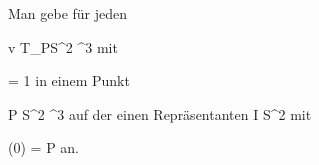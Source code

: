 {

Man gebe für jeden

\mavergleichskette
{\vergleichskette
{ v
}
{ \in }{ T_PS^2
}
{ \subseteq }{ \R^3
}
{    }{
}
{   }{
}
}
{}{}{}
mit

\mavergleichskette
{\vergleichskette
{  \Vert
}
{ = }{ 1
}
{  }{
}
{    }{
}
{   }{
}
}
{}{}{}
in einem Punkt

\mavergleichskette
{\vergleichskette
{ P
}
{ \in }{ S^2
}
{ \subset }{ \R^3
}
{    }{
}
{   }{
}
}
{}{}{}
auf der
einen
Repräsentanten
\maabbdisp {\gamma} { I } { S^2
} {}
mit

\mavergleichskette
{\vergleichskette
{ \gamma(0)
}
{ = }{ P
}
{  }{
}
{    }{
}
{   }{
}
}
{}{}{}
an.

}
